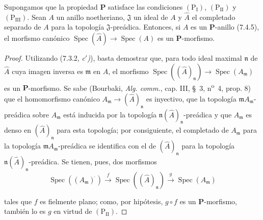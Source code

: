 \begin{proposition}[7.4.6]
\label{IV.2.s7.4.6-fr}
Supongamos que la propiedad $\boldsymbol P$ satisface las condiciones
$(\mathrm P_{\mathrm I})$, $(\mathrm P_{\mathrm{II}})$ y
$(\mathrm P_{\mathrm{III}})$. Sean $A$ un anillo noetheriano,
$\mathfrak J$ un ideal de $A$ y $\widehat A$ el completado separado de
$A$ para la topología $\mathfrak J$-preádica. Entonces, si $A$ es un
$\boldsymbol P$-anillo (7.4.5), el morfismo canónico
$\operatorname{Spec}(\widehat A)\to\operatorname{Spec}(A)$ es un
$\boldsymbol P$-morfismo.
\end{proposition}

\begin{proof}
Utilizando (7.3.2, \emph{c$'$)}), basta demostrar que, para todo ideal
maximal $\mathfrak n$ de $\widehat A$ cuya imagen inversa es
$\mathfrak m$ en $A$, el morfismo
$\operatorname{Spec}((\widehat A)_{\mathfrak n})\to
\operatorname{Spec}(A_{\mathfrak m})$ es un $\boldsymbol P$-morfismo.
Se sabe (Bourbaki, \emph{Alg. comm.}, cap. III, \S~3,
n\textsuperscript{o}~4, prop. 8) que el homomorfismo canónico
$A_{\mathfrak m}\to(\widehat A)_{\mathfrak n}$ es inyectivo, que la
topología $\mathfrak mA_{\mathfrak m}$-preádica sobre $A_{\mathfrak m}$
está inducida por la topología
$\mathfrak n(\widehat A)_{\mathfrak n}$-preádica y que
$A_{\mathfrak m}$ es denso en $(\widehat A)_{\mathfrak n}$ para esta
topología; por consiguiente, el completado de $A_{\mathfrak m}$ para la
topología $\mathfrak mA_{\mathfrak m}$-preádica se identifica con el de
$(\widehat A)_{\mathfrak n}$ para la topología
$\mathfrak n(\widehat A)_{\mathfrak n}$-preádica. Se tienen, pues, dos
morfismos
\[
\operatorname{Spec}((A_{\mathfrak m})^{\widehat{\,}})
\xrightarrow{f}\operatorname{Spec}((\widehat A)_{\mathfrak n})
\xrightarrow{g}\operatorname{Spec}(A_{\mathfrak m})
\]


tales que $f$ es fielmente plano; como, por hipótesis, $g\circ f$ es un
$\boldsymbol P$-morfismo, también lo es $g$ en virtud de
$(\mathrm P_{\mathrm{II}})$.
\end{proof}
